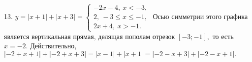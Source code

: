 13. $y=|x+1|+|x+3|=\begin{cases}-2x-4,\ x<-3,\\ 2,\ -3\leqslant x\leqslant -1,\\ 2x+4,\ x>-1.\end{cases}$ Осью симметрии этого графика является вертикальная прямая, делящая пополам отрезок $[-3;-1],$ то есть $x=-2.$ Действительно, $|-2+x+1|+|-2+x+3|=|x-1|+|x+1|=|-2-x+3|+|-2-x+1|.$\\
